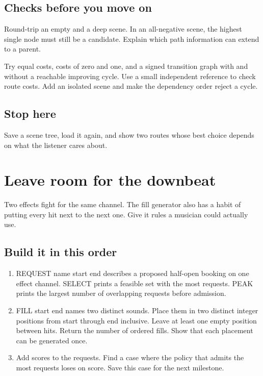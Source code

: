\documentclass[11pt,letterpaper]{article}
\begin{document}
\subsection*{Checks before you move on}

Round-trip an empty and a deep scene. In an all-negative scene, the highest single node must still be a candidate. Explain which path information can extend to a parent.

Try equal costs, costs of zero and one, and a signed transition graph with and without a reachable improving cycle. Use a small independent reference to check route costs. Add an isolated scene and make the dependency order reject a cycle.

\subsection*{Stop here}

Save a scene tree, load it again, and show two routes whose best choice depends on what the listener cares about.

\clearpage

\section{Leave room for the downbeat}\label{groovebox:05}

Two effects fight for the same channel. The fill generator also has a habit of putting every hit next to the next one. Give it rules a musician could actually use.

\subsection*{Build it in this order}

\begin{enumerate}
\item REQUEST name start end describes a proposed half-open booking on one effect channel. SELECT prints a feasible set with the most requests. PEAK prints the largest number of overlapping requests before admission.
\item FILL start end names two distinct sounds. Place them in two distinct integer positions from start through end inclusive. Leave at least one empty position between hits. Return the number of ordered fills. Show that each placement can be generated once.
\item Add scores to the requests. Find a case where the policy that admits the most requests loses on score. Save this case for the next milestone.
\end{enumerate}
\end{document}
